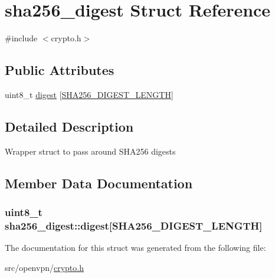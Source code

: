 \hypertarget{structsha256__digest}{}\section{sha256\+\_\+digest Struct Reference}
\label{structsha256__digest}


{\ttfamily \#include $<$crypto.\+h$>$}

\subsection*{Public Attributes}
\begin{DoxyCompactItemize}
\item 
uint8\+\_\+t \hyperlink{structsha256__digest_ab33fddc33bcbd885fc183ce3803a0ba3}{digest} \mbox{[}\hyperlink{crypto__mbedtls_8h_aa9cf0abf87b30c4c63e9c7e89c590579}{S\+H\+A256\+\_\+\+D\+I\+G\+E\+S\+T\+\_\+\+L\+E\+N\+G\+T\+H}\mbox{]}
\end{DoxyCompactItemize}


\subsection{Detailed Description}
Wrapper struct to pass around S\+H\+A256 digests 

\subsection{Member Data Documentation}
\hypertarget{structsha256__digest_ab33fddc33bcbd885fc183ce3803a0ba3}{}
\subsubsection[{digest}]{\setlength{\rightskip}{0pt plus 5cm}uint8\+\_\+t sha256\+\_\+digest\+::digest\mbox{[}{\bf S\+H\+A256\+\_\+\+D\+I\+G\+E\+S\+T\+\_\+\+L\+E\+N\+G\+T\+H}\mbox{]}}\label{structsha256__digest_ab33fddc33bcbd885fc183ce3803a0ba3}


The documentation for this struct was generated from the following file\+:\begin{DoxyCompactItemize}
\item 
src/openvpn/\hyperlink{crypto_8h}{crypto.\+h}\end{DoxyCompactItemize}
